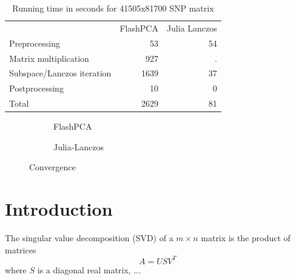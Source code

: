 \documentclass[final,leqno]{siamltex1213}
\begin{document}
\begin{table}
    \caption{Running time in seconds for 41505x81700 SNP matrix}
    \centering
    \begin{tabular}{lrr}
                                   & FlashPCA & Julia Lanczos \\
        Preprocessing              &   53     & 54            \\
        Matrix multiplication      &  927     & .             \\
        Subspace/Lanczos iteration & 1639     & 37            \\
        Postprocessing             &   10     & 0             \\
        Total                      & 2629     & 81
    \end{tabular}
\end{table}

\begin{figure}
    \centering
    \begin{subfigure}{0.75\textwidth}
        \caption{FlashPCA}
    \end{subfigure}
    \begin{subfigure}{0.2\textwidth}
        \caption{Julia-Lanczos}
    \end{subfigure}
    \caption{Convergence}
\end{figure}

\section{Introduction}

The singular value decomposition (SVD) of a $m\times n$ matrix is
the product of matrices
\[
A=USV^{T}
\]
where $S$ is a diagonal real matrix, ...
\end{document}
